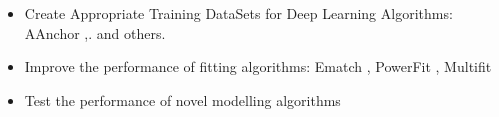 { \LARGE
\begin{itemize}
    \item Create Appropriate Training DataSets for Deep Learning Algorithms: AAnchor \cite{Rozanov2018},\cite{Li2016}. and others. 
	\item Improve the performance of fitting algorithms: Ematch \cite{Dror2007} , PowerFit \cite{C.P.vanZundert2015}, Multifit \cite{Tjioe2011}
	\item Test the performance of novel modelling algorithms
\end{itemize}
}